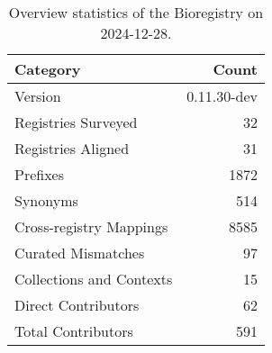 \begin{table}
\caption{Overview statistics of the Bioregistry on 2024-12-28.}
\label{tab:bioregistry-summary}
\begin{tabular}{lr}
\toprule
Category & Count \\
\midrule
Version & 0.11.30-dev \\
Registries Surveyed & 32 \\
Registries Aligned & 31 \\
Prefixes & 1872 \\
Synonyms & 514 \\
Cross-registry Mappings & 8585 \\
Curated Mismatches & 97 \\
Collections and Contexts & 15 \\
Direct Contributors & 62 \\
Total Contributors & 591 \\
\bottomrule
\end{tabular}
\end{table}

